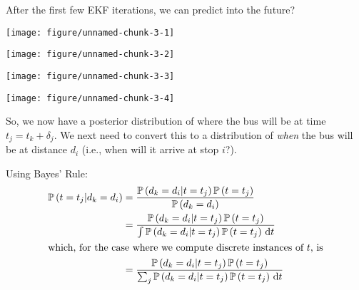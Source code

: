\documentclass[11pt]{article}\usepackage[]{graphicx}\usepackage[]{color}
\newenvironment{knitrout}{}{} %
\newcommand{\pr}{\mathbb{P}}
\renewcommand{\Pr}[1]{\pr\left(#1\right)}
\begin{document}
After the first few EKF iterations, we can predict into the future?

\begin{knitrout}
\color{fgcolor}

{\centering \texttt{[image: figure/unnamed-chunk-3-1]}

}




{\centering \texttt{[image: figure/unnamed-chunk-3-2]}

}




{\centering \texttt{[image: figure/unnamed-chunk-3-3]}

}




{\centering \texttt{[image: figure/unnamed-chunk-3-4]}

}



\end{knitrout}




So, we now have a posterior distribution of where the bus will be at time $t_j = t_k + \delta_j$.
We next need to convert this to a distribution of \emph{when} the bus will be at distance $d_i$
(i.e., when will it arrive at stop $i$?).

Using Bayes' Rule:
\begin{align*}
   \Pr{t = t_j | d_k = d_i}
  &= \frac{\Pr{d_k = d_i | t = t_j} \Pr{t = t_j}}{\Pr{d_k = d_i}} \\
  &= \frac{\Pr{d_k = d_i | t = t_j} \Pr{t = t_j}}{\int\Pr{d_k = d_i | t = t_j} \Pr{t = t_j}\,\mathrm{d}t} \\
  \intertext{which, for the case where we compute discrete instances of $t$, is}
  &= \frac{\Pr{d_k = d_i | t = t_j} \Pr{t = t_j}}{\sum_j\Pr{d_k = d_i | t = t_j} \Pr{t = t_j}\,\mathrm{d}t} \\
\end{align*}
\end{document}
